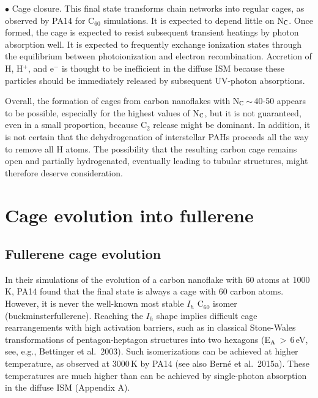 \documentclass{aa}
\begin{document}
$\bullet$ Cage closure. This final state transforms chain networks into regular cages, as observed by PA14   for C$_{60}$ simulations. It is expected to depend little on  N$_{\rm C}$. Once formed, the cage is expected to resist subsequent transient heatings by photon absorption well. It is expected to frequently exchange ionization states through the equilibrium between photoionization and electron recombination. Accretion of H, H$^+$, and e$^-$  is thought to be inefficient in the diffuse ISM because these particles should be immediately 
released by subsequent UV-photon absorptions.

Overall, the formation of cages from carbon nanoflakes with  N$_{\rm C}$\,$\sim$\,40-50 appears to be possible, especially for the highest values of  N$_{\rm C}$, but it is not guaranteed, even in a small proportion, because C$_2$ release might be dominant.  
In addition, it is not certain that the dehydrogenation of interstellar PAHs proceeds all the way to remove all H atoms. The possibility that the resulting carbon cage remains open and partially hydrogenated, eventually leading to tubular structures, might therefore deserve consideration.


\section{Cage evolution into fullerene}

\subsection{Fullerene cage evolution}

In their simulations of the evolution of a carbon nanoflake with 60 atoms 
at 1000\,K, PA14 found that the final state is always a cage with 60 carbon atoms. However, it is never the well-known most stable  $I_h$ C$_{60}$ 
isomer (buckminsterfullerene). Reaching the $I_h$ shape implies difficult 
cage rearrangements with high activation barriers, such as in classical Stone-Wales transformations of pentagon-heptagon structures into two hexagons (E$_{\rm A}$\,$>$\,6\,eV, see, e.g., Bettinger et al.\ 2003). Such isomerizations can be achieved at higher temperature, as observed at 3000\,K 
by PA14 (see also Bern\'e et al.\ 2015a). These temperatures are much higher than can be achieved by single-photon absorption in the diffuse ISM (Appendix A).
\end{document}
